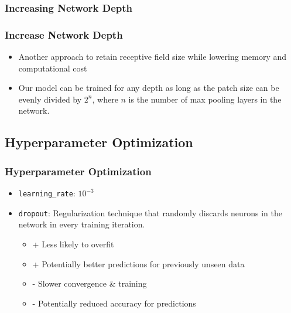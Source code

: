 \documentclass{beamer}
\begin{document}
\subsubsection{Increasing Network Depth}
\begin{frame}
    \frametitle{Increase Network Depth}
    \begin{itemize}
        \item Another approach to retain receptive field size while lowering memory and computational cost
        \item Our model can be trained for any depth as long as the patch size can be evenly divided by $2^n$, where $n$ is the number of max pooling layers in the network.
    \end{itemize}
\end{frame}

\subsection{Hyperparameter Optimization}
\begin{frame}
    \frametitle{Hyperparameter Optimization}
    \begin{itemize}
        \item \texttt{learning\_rate}: $10^{-3}$
        \item \texttt{dropout}: Regularization technique that randomly discards neurons in the network in every training iteration.
            \begin{itemize}
                \item + Less likely to overfit
                \item + Potentially better predictions for previously unseen data
                \item - Slower convergence \& training
                \item - Potentially reduced accuracy for predictions
            \end{itemize}
    \end{itemize}
\end{frame}
\end{document}

